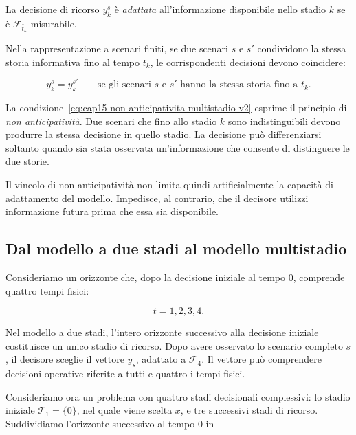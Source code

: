 \begin{definition}

\label{def:cap15-decisione-adattata-v2}

La decisione di ricorso $y_k^s$ \`e \emph{adattata} all'informazione
disponibile nello stadio $k$ se \`e
$\mathcal F_{\bar t_k}$-misurabile.

Nella rappresentazione a scenari finiti, se due scenari $s$ e $s'$
condividono la stessa storia informativa fino al tempo $\bar t_k$,
le corrispondenti decisioni devono coincidere:

\begin{equation}
y_k^s=y_k^{s'}
\qquad
\text{se gli scenari }s\text{ e }s'
\text{ hanno la stessa storia fino a }\bar t_k.
\label{eq:cap15-non-anticipativita-multistadio-v2}
\end{equation}

\end{definition}
La condizione~\eqref{eq:cap15-non-anticipativita-multistadio-v2}
esprime il principio di \emph{non anticipativit\`a}.
Due scenari che fino allo stadio $k$ sono
indistinguibili devono produrre la stessa decisione in quello stadio. La
decisione pu\`o differenziarsi soltanto quando sia stata osservata
un'informazione che consente di distinguere le due storie.

Il vincolo di non anticipativit\`a non limita quindi artificialmente la
capacit\`a di adattamento del modello. Impedisce, al contrario, che il
decisore utilizzi informazione futura prima che essa sia disponibile.

\subsection{Dal modello a due stadi al modello multistadio}

Consideriamo un orizzonte che, dopo la decisione iniziale
al tempo $0$, comprende quattro tempi fisici:

\[
t=1,2,3,4.
\]

Nel modello a due stadi, l'intero orizzonte successivo
alla decisione iniziale costituisce un unico stadio
di ricorso. Dopo avere osservato lo scenario completo
$s$, il decisore sceglie il vettore $y_s$, adattato
a $\mathcal F_4$. Il vettore pu\`o comprendere
decisioni operative riferite a tutti e quattro
i tempi fisici.

Consideriamo ora un problema con quattro stadi
decisionali complessivi: lo stadio iniziale $\mathcal T_1=\{0\}$,
nel quale viene scelta $x$, e tre successivi
stadi di ricorso. Suddividiamo l'orizzonte
successivo al tempo $0$ in

